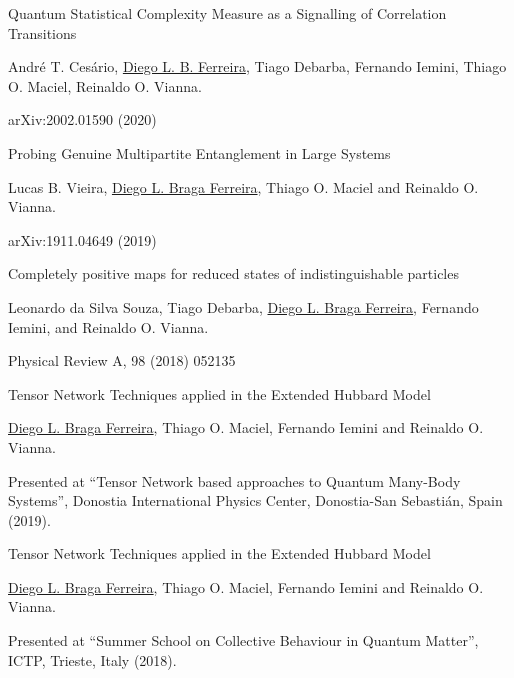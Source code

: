 \documentclass[a4paper,10pt]{article}
\newlength{\cvcolumngapwidth}
\newlength{\cvleftcolumnwidth}
\newlength{\cvrightcolumnwidth}
\newcommand{\cvtitlestyle}[1]{{\normalsize\cvtitlefont\textcolor{cvtitlecolor}{#1}}}
\newcommand{\cvdurationstyle}[1]{{\normalsize\cvdurationfont\textcolor{cvdurationcolor}{#1}}}
\newlength{\cvafteritemskipamount}
\newlength{\cvaftertitleskipamount}
\newlength{\cvparskip}
\newcommand{\cvitem}[2]{
    \begin{minipage}[t]{\cvleftcolumnwidth}
        \raggedleft #1
    \end{minipage}%
    \hspace{\cvcolumngapwidth}%
    \begin{minipage}[t]{\cvrightcolumnwidth}
        \setlength{\parskip}{\cvparskip} #2
    \end{minipage}
    \vspace{\cvafteritemskipamount}}
\newcommand{\cvtitle}[1]{
    \cvtitlestyle{#1}
    \vspace{\cvaftertitleskipamount}
    \vspace{-\cvparskip}}
\begin{document}
\cvitem{\cvdurationstyle{Preprint}}
    {\cvtitle{Quantum Statistical Complexity Measure as a Signalling of Correlation Transitions}
    
    \vspace{0.2cm}
    Andr\'e T. Ces\'ario, \underline{Diego L. B. Ferreira}, Tiago Debarba, Fernando Iemini, Thiago O. Maciel, Reinaldo O. Vianna.
    
    \vspace{0.2cm}
    arXiv:2002.01590 (2020)}
        
\cvitem{\cvdurationstyle{Preprint}}
    {\cvtitle{Probing Genuine Multipartite Entanglement in Large Systems}
    
    \vspace{0.2cm}
    Lucas B. Vieira, \underline{Diego L. Braga Ferreira}, Thiago O. Maciel and Reinaldo O. Vianna.
    
    \vspace{0.2cm}
    arXiv:1911.04649 (2019)}
        
\cvitem{\cvdurationstyle{Journal}}
    {\cvtitle{Completely positive maps for reduced states of indistinguishable particles}
    
    \vspace{0.2cm}
    Leonardo da Silva Souza, Tiago Debarba, \underline{Diego L. Braga Ferreira}, Fernando Iemini, and Reinaldo O. Vianna.
    
    \vspace{0.2cm}
    Physical Review A, 98 (2018) 052135}
    
\cvitem{\cvdurationstyle{Poster}}
    {\cvtitle{Tensor Network Techniques applied in the Extended
    Hubbard Model}
    
    \vspace{0.2cm}
    \underline{Diego L. Braga Ferreira}, Thiago O. Maciel, Fernando Iemini and Reinaldo O. Vianna.
    
    \vspace{0.2cm}
    Presented at ``Tensor Network based approaches to Quantum Many-Body Systems'', Donostia International Physics Center, Donostia-San Sebasti\'an, Spain (2019).}
    
\cvitem{\cvdurationstyle{Poster}}
    {\cvtitle{Tensor Network Techniques applied in the Extended
    Hubbard Model}
    
    \vspace{0.2cm}
    \underline{Diego L. Braga Ferreira}, Thiago O. Maciel, Fernando Iemini and Reinaldo O. Vianna.
    
    \vspace{0.2cm}
    Presented at ``Summer School on Collective Behaviour in Quantum Matter'', ICTP, Trieste, Italy (2018).}
\end{document}
